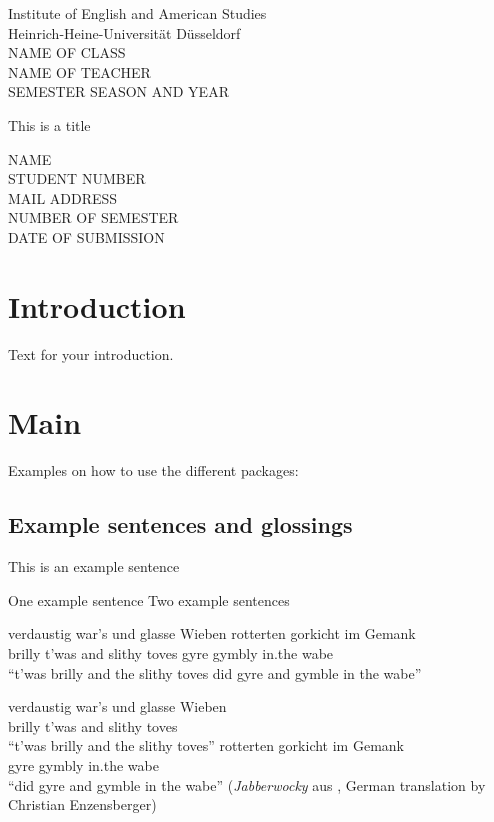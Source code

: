 \documentclass{article}
\begin{document}
\begin{titlepage}
\noindent\parbox{.5\textwidth}{
Institute of English and American Studies\\
Heinrich-Heine-Universität Düsseldorf\\
NAME OF CLASS\\
NAME OF TEACHER\\
SEMESTER SEASON AND YEAR}

\vfill

{\centering\Large

This is a title

}

\vfill

\noindent\parbox{.5\textwidth}
{NAME\\
STUDENT NUMBER\\
MAIL ADDRESS\\
NUMBER OF SEMESTER\\
DATE OF SUBMISSION}

\end{titlepage}

\tableofcontents

\section{Introduction}
Text for your introduction.

\section{Main}
Examples on how to use the different packages: 

\subsection{Example sentences and glossings}

\begin{exe}
\ex This is an example sentence

\ex \begin{xlista}  
\ex One example sentence 
  \ex Two example sentences
\end{xlista}


\ex \gll verdaustig war's und glasse Wieben rotterten gorkicht im Gemank\\
        brilly t'was and slithy toves gyre gymbly in.the wabe\\
        \enquote{t'was brilly and the slithy toves did gyre and gymble in the wabe}

\ex \begin{xlista}
 \ex \gll verdaustig war's und glasse Wieben\\
        brilly t'was and slithy toves\\
        \enquote{t'was brilly and the slithy toves}
    \ex \gll rotterten gorkicht im Gemank\\
        gyre gymbly in.the wabe\\
        \enquote{did gyre and gymble in the wabe} (\emph{Jabberwocky} aus \citealt{Carroll1897}, German translation by Christian Enzensberger) 
        \end{xlista}
\end{exe}
\end{document}

